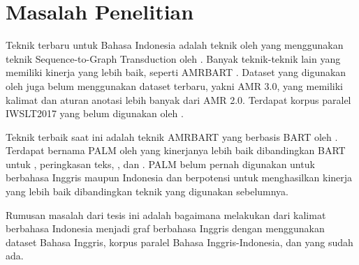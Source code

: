 \section{Masalah Penelitian}

Teknik  \amrparsing{} terbaru untuk Bahasa Indonesia adalah teknik oleh \textcite{putra2022} yang menggunakan teknik Sequence-to-Graph Transduction oleh .
Banyak teknik-teknik lain yang memiliki kinerja \amrparsing{} yang lebih baik, seperti AMRBART .
Dataset yang digunakan oleh \textcite{putra2022} juga belum menggunakan dataset terbaru, yakni AMR 3.0, yang memiliki kalimat dan aturan anotasi lebih banyak dari AMR 2.0.
Terdapat korpus paralel IWSLT2017  yang belum digunakan oleh \textcite{putra2022}.

Teknik \amrparsing{} terbaik saat ini adalah teknik AMRBART yang berbasis  BART oleh \textcite{lewis2020}.
Terdapat  bernama PALM oleh \textcite{bi2020} yang kinerjanya lebih baik dibandingkan BART untuk  , peringkasan teks, , dan .
 PALM belum pernah digunakan untuk \amrparsing{} berbahasa Inggris maupun Indonesia dan berpotensi untuk menghasilkan kinerja yang lebih baik dibandingkan teknik yang digunakan sebelumnya.

Rumusan masalah dari tesis ini adalah bagaimana melakukan \amrparsing{} dari kalimat berbahasa Indonesia menjadi graf \AMR{} berbahasa Inggris dengan menggunakan dataset \AMR{} Bahasa Inggris, korpus paralel Bahasa Inggris-Indonesia, dan \multil{}  yang sudah ada.
